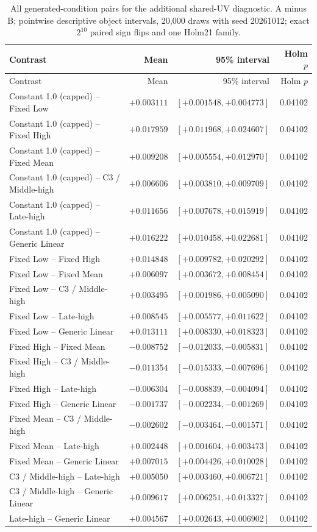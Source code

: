 \documentclass[11pt]{article}
\begin{document}
\begin{longtable}{p{}rrr}
\caption{All generated-condition pairs for the additional shared-UV diagnostic. A minus B; pointwise descriptive object intervals, 20,000 draws with seed 20261012; exact $2^{10}$ paired sign flips and one Holm21 family.}\label{tab:cross-view-all015}\\
\toprule Contrast & Mean & 95\% interval & Holm $p$ \\
\midrule\endfirsthead\toprule Contrast & Mean & 95\% interval & Holm $p$ \\
\midrule\endhead

Constant 1.0 (capped) -- Fixed Low & $+0.003111$ & $[+0.001548,+0.004773]$ & 0.04102 \\
Constant 1.0 (capped) -- Fixed High & $+0.017959$ & $[+0.011968,+0.024607]$ & 0.04102 \\
Constant 1.0 (capped) -- Fixed Mean & $+0.009208$ & $[+0.005554,+0.012970]$ & 0.04102 \\
Constant 1.0 (capped) -- C3 / Middle-high & $+0.006606$ & $[+0.003810,+0.009709]$ & 0.04102 \\
Constant 1.0 (capped) -- Late-high & $+0.011656$ & $[+0.007678,+0.015919]$ & 0.04102 \\
Constant 1.0 (capped) -- Generic Linear & $+0.016222$ & $[+0.010458,+0.022681]$ & 0.04102 \\
Fixed Low -- Fixed High & $+0.014848$ & $[+0.009782,+0.020292]$ & 0.04102 \\
Fixed Low -- Fixed Mean & $+0.006097$ & $[+0.003672,+0.008454]$ & 0.04102 \\
Fixed Low -- C3 / Middle-high & $+0.003495$ & $[+0.001986,+0.005090]$ & 0.04102 \\
Fixed Low -- Late-high & $+0.008545$ & $[+0.005577,+0.011622]$ & 0.04102 \\
Fixed Low -- Generic Linear & $+0.013111$ & $[+0.008330,+0.018323]$ & 0.04102 \\
Fixed High -- Fixed Mean & $-0.008752$ & $[-0.012033,-0.005831]$ & 0.04102 \\
Fixed High -- C3 / Middle-high & $-0.011354$ & $[-0.015333,-0.007696]$ & 0.04102 \\
Fixed High -- Late-high & $-0.006304$ & $[-0.008839,-0.004094]$ & 0.04102 \\
Fixed High -- Generic Linear & $-0.001737$ & $[-0.002234,-0.001269]$ & 0.04102 \\
Fixed Mean -- C3 / Middle-high & $-0.002602$ & $[-0.003464,-0.001571]$ & 0.04102 \\
Fixed Mean -- Late-high & $+0.002448$ & $[+0.001604,+0.003473]$ & 0.04102 \\
Fixed Mean -- Generic Linear & $+0.007015$ & $[+0.004426,+0.010028]$ & 0.04102 \\
C3 / Middle-high -- Late-high & $+0.005050$ & $[+0.003460,+0.006721]$ & 0.04102 \\
C3 / Middle-high -- Generic Linear & $+0.009617$ & $[+0.006251,+0.013327]$ & 0.04102 \\
Late-high -- Generic Linear & $+0.004567$ & $[+0.002643,+0.006902]$ & 0.04102 \\


\bottomrule\end{longtable}
\end{document}

